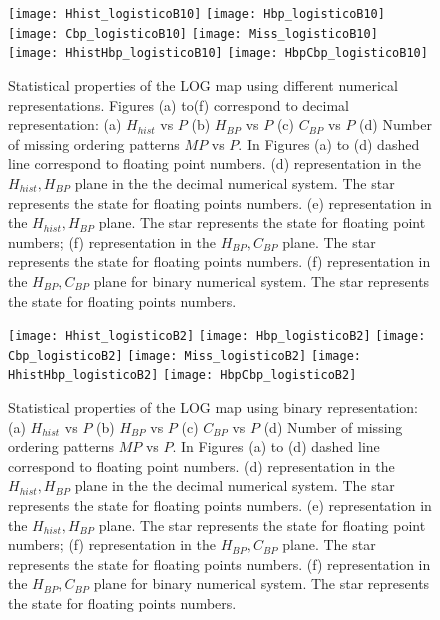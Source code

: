 \begin{figure}
	\texttt{[image: Hhist\_logisticoB10]}
	\texttt{[image: Hbp\_logisticoB10]}
	\texttt{[image: Cbp\_logisticoB10]}
	\texttt{[image: Miss\_logisticoB10]}
	\texttt{[image: HhistHbp\_logisticoB10]}
	\texttt{[image: HbpCbp\_logisticoB10]}
	\caption{Statistical properties of the LOG map using different numerical representations. Figures (a) to(f) correspond to decimal representation: (a) $H_{hist}$ vs $P$ (b) $H_{BP}$ vs $P$ (c) $C_{BP}$ vs $P$ (d) Number of missing ordering patterns $MP$ vs $P$. In Figures (a) to (d) dashed line correspond to floating point numbers. (d) representation in the $H_{hist},H_{BP}$ plane in the the decimal numerical system.  The star represents the state for floating points numbers. (e) representation in the $H_{hist},H_{BP}$ plane. The star represents the state for floating point numbers; (f) representation in the $H_{BP},C_{BP}$ plane.  The star represents the state for floating points numbers. (f) representation in the $H_{BP},C_{BP}$ plane for binary numerical system.  The star represents the state for floating points numbers. } \label{fig:LOGdecimal}
\end{figure}
\begin{figure}
	\texttt{[image: Hhist\_logisticoB2]}
	\texttt{[image: Hbp\_logisticoB2]}
	\texttt{[image: Cbp\_logisticoB2]}
	\texttt{[image: Miss\_logisticoB2]}
	\texttt{[image: HhistHbp\_logisticoB2]}
	\texttt{[image: HbpCbp\_logisticoB2]}
	\caption{Statistical properties of the LOG map using binary representation: (a) $H_{hist}$ vs $P$ (b) $H_{BP}$ vs $P$ (c) $C_{BP}$ vs $P$ (d) Number of missing ordering patterns $MP$ vs $P$. In Figures (a) to (d) dashed line correspond to floating point numbers. (d) representation in the $H_{hist},H_{BP}$ plane in the the decimal numerical system.  The star represents the state for floating points numbers. (e) representation in the $H_{hist},H_{BP}$ plane. The star represents the state for floating point numbers; (f) representation in the $H_{BP},C_{BP}$ plane.  The star represents the state for floating points numbers. (f) representation in the $H_{BP},C_{BP}$ plane for binary numerical system.  The star represents the state for floating points numbers. } \label{fig:LOGbinario}
\end{figure}

